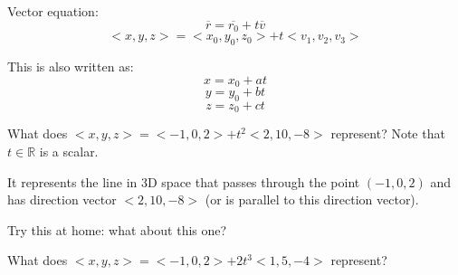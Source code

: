 \documentclass{article}
\begin{document}
\begin{definitionbox}
Vector equation:
\[
    \overline{r} = \overline{r_0} + t\overline{v}
\]
\[
    <x, y, z> = <x_0, y_0, z_0> + t<v_1, v_2, v_3>
\]
\end{definitionbox}
\begin{definitionbox}
This is also written as:
\[
    x = x_0 + at
\]
\[
    y = y_0 + bt
\]
\[
    z = z_0 + ct
\]
\end{definitionbox}

\begin{examplebox}
What does \( <x, y, z> = <-1, 0, 2> + t^2 <2, 10, -8> \) represent? Note that \( t \in \mathbb{R} \) is a scalar.
\begin{solutionbox}
It represents the line in 3D space that passes through the point \( (-1, 0, 2) \) and has direction vector \( <2, 10, -8> \) (or is parallel to this direction vector).
\end{solutionbox}
\end{examplebox}

Try this at home: what about this one?
\begin{exercisebox}
What does \( <x, y, z> = <-1, 0, 2> + 2t^3 <1, 5, -4> \) represent?
\end{exercisebox}
\end{document}
